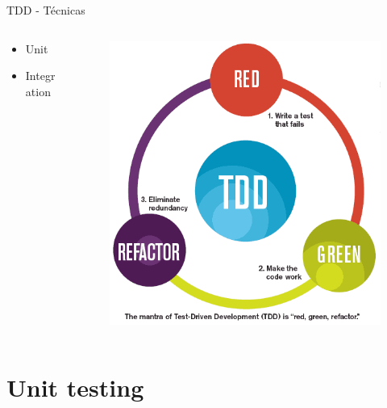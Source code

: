 \documentclass{beamer}
\begin{document}
\begin{frame}{TDD - Técnicas}
\begin{columns}[T]
\begin{column}[T]{4cm}
\begin{itemize}
\item Unit
\item Integration
\end{itemize}
\end{column}
\begin{column}[T]{6cm} %
\begin{figure}
\centering
\includegraphics[width=0.9\linewidth]{Images/tdd}
\end{figure}
\end{column}
\end{columns}
\end{frame}

\section{Unit testing}
\end{document}
